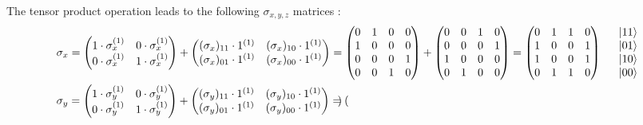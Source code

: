 \documentclass[10pt, a4paper]{article}
\begin{document}
The tensor product operation leads to the following $\sigma_{x, y, z}$ matrices : 
\begin{align*}
    &\sigma_x = \begin{pmatrix}1\cdot\sigma_x^{(1)} & 0\cdot\sigma_x^{(1)}\\0\cdot\sigma_x^{(1)} & 1\cdot\sigma_x^{(1)}\end{pmatrix} + \begin{pmatrix}(\sigma_{x})_{11}\cdot 1^{(1)} & (\sigma_{x})_{10}\cdot 1^{(1)}\\(\sigma_{x})_{01}\cdot 1^{(1)}& (\sigma_{x})_{00}\cdot 1^{(1)}\end{pmatrix} = 
    \begin{pmatrix}
        0 & 1 & 0 & 0\\
        1 & 0 & 0 & 0\\
        0 & 0 & 0 & 1\\
        0 & 0 & 1 & 0
    \end{pmatrix} + 
    \begin{pmatrix}
        0 & 0 & 1 & 0\\
        0 & 0 & 0 & 1\\
        1 & 0 & 0 & 0\\
        0 & 1 & 0 & 0
    \end{pmatrix}
    =
    \begin{pmatrix}
        0 & 1 & 1 & 0\\
        1 & 0 & 0 & 1\\
        1 & 0 & 0 & 1\\
        0 & 1 & 1 & 0
    \end{pmatrix}
    \quad 
    \begin{array}{ll}
        \ket{11} \\ \ket{01}\\ \ket{10}\\ \ket{00}
    \end{array}
    \\
    &\sigma_y = \begin{pmatrix}1\cdot\sigma_y^{(1)} & 0\cdot\sigma_y^{(1)}\\0\cdot\sigma_y^{(1)} & 1\cdot\sigma_y^{(1)}\end{pmatrix} + \begin{pmatrix}(\sigma_{y})_{11}\cdot 1^{(1)} & (\sigma_{y})_{10}\cdot 1^{(1)}\\(\sigma_{y})_{01}\cdot 1^{(1)}& (\sigma_{y})_{00}\cdot 1^{(1)}\end{pmatrix} =  
    \begin{pmatrix}

\end{pmatrix}
\end{align*}
\end{document}
